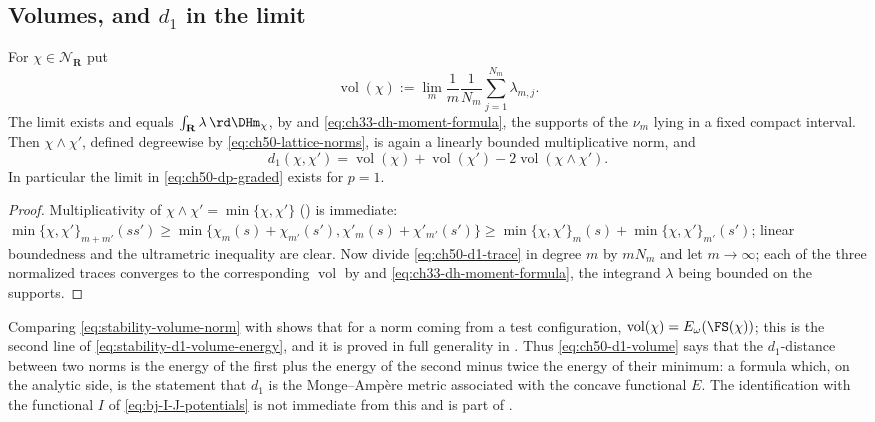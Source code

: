 \subsection{Volumes, and \texorpdfstring{$d_1$}{d1} in the limit}
\label{sec:ch50-volume}

\begin{proposition}
\label{prop:ch50-d1-volume}
For $\chi\in\mathcal N_{\mathbf R}$ put
\[
 \operatorname{vol}(\chi)
 :=\lim_m\frac1m\frac1{N_m}
              \sum_{j=1}^{N_m}\lambda_{m,j}.
\tag{50.26}\label{eq:stability-volume-norm}
\]
The limit exists and equals $\int_{\mathbf R}\lambda\,\rd\DHm_\chi$, by
 and \eqref{eq:ch33-dh-moment-formula}, the
supports of the $\nu_m$ lying in a fixed compact interval.  Then
$\chi\wedge\chi'$, defined degreewise by \eqref{eq:ch50-lattice-norms},
is again a linearly bounded multiplicative norm, and
\[
 d_1(\chi,\chi')
 =\operatorname{vol}(\chi)+\operatorname{vol}(\chi')
       -2\operatorname{vol}(\chi\wedge\chi').
\tag{50.27}\label{eq:ch50-d1-volume}
\]
In particular the limit in \eqref{eq:ch50-dp-graded} exists for $p=1$.
\end{proposition}

\begin{proof}
Multiplicativity of $\chi\wedge\chi'=\min\{\chi,\chi'\}$
() is immediate:
$\min\{\chi,\chi'\}_{m+m'}(ss')\ge\min\{\chi_m(s)+\chi_{m'}(s'),
\chi'_m(s)+\chi'_{m'}(s')\}\ge\min\{\chi,\chi'\}_m(s)
+\min\{\chi,\chi'\}_{m'}(s')$; linear boundedness and the ultrametric
inequality are clear.  Now divide \eqref{eq:ch50-d1-trace} in degree $m$
by $mN_m$ and let $m\to\infty$; each of the three normalized traces
converges to the corresponding $\operatorname{vol}$ by
 and \eqref{eq:ch33-dh-moment-formula},
the integrand $\lambda$ being bounded on the supports.
\end{proof}

\begin{remark}
\label{rem:ch50-volume-energy}
Comparing \eqref{eq:stability-volume-norm} with
 shows that for a norm coming from a test
configuration, $\operatorname{vol}(\chi)=E_\omega(\FS(\chi))$; this is the
second line of \eqref{eq:stability-d1-volume-energy}, and it is proved in
full generality in .  Thus
\eqref{eq:ch50-d1-volume} says that the $d_1$-distance between two norms
is the energy of the first plus the energy of the second minus twice the
energy of their minimum: a formula which, on the analytic side, is the
statement that $d_1$ is the Monge--Amp\`ere metric associated with the
concave functional $E$.  The identification with the functional $I$ of
\eqref{eq:bj-I-J-potentials} is not immediate from this and is part of
.
\end{remark}

